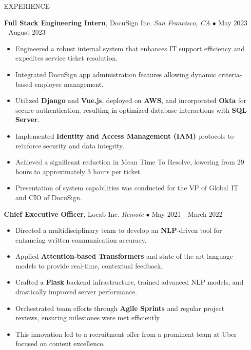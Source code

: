 \documentclass{resume} %
\begin{document}
\begin{rSection}{EXPERIENCE}

\textbf{Full Stack Engineering Intern}, DocuSign Inc. \hfill \textit{San Francisco, CA} $\bullet$ May 2023 - August 2023
\vspace{-2mm}
\begin{itemize}
\itemsep -6pt {}

            \item Engineered a robust internal system that enhances IT support efficiency and expedites service ticket resolution.\n
            \item Integrated DocuSign app administration features allowing dynamic criteria-based employee management.\n
            \item Utilized \textbf{Django} and \textbf{Vue.js}, deployed on \textbf{AWS}, and incorporated \textbf{Okta} for secure authentication, resulting in optimized database interactions with \textbf{SQL Server}.\n
            \item Implemented \textbf{Identity and Access Management (IAM)} protocols to reinforce security and data integrity.\n
            \item Achieved a significant reduction in Mean Time To Resolve, lowering from 29 hours to approximately 3 hours per ticket.\n
            \item Presentation of system capabilities was conducted for the VP of Global IT and CIO of DocuSign.
        \end{itemize}

\vspace{-1mm}

\textbf{Chief Executive Officer}, Locab Inc. \hfill \textit{Remote} $\bullet$ May 2021 - March 2022
\vspace{-2mm}
\begin{itemize}
\itemsep -6pt {}

            \item Directed a multidisciplinary team to develop an \textbf{NLP}-driven tool for enhancing written communication accuracy.\n
            \item Applied \textbf{Attention-based Transformers} and state-of-the-art language models to provide real-time, contextual feedback.\n
            \item Crafted a \textbf{Flask} backend infrastructure, trained advanced NLP models, and drastically improved server performance.\n
            \item Orchestrated team efforts through \textbf{Agile Sprints} and regular project reviews, ensuring milestones were met efficiently.\n
            \item This innovation led to a recruitment offer from a prominent team at Uber focused on content excellence.
        \end{itemize}


\end{rSection}
\end{document}

